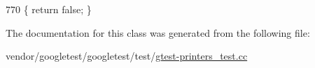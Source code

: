 \begin{DoxyCode}
770 \{ \textcolor{keywordflow}{return} \textcolor{keyword}{false}; \}
\end{DoxyCode}


The documentation for this class was generated from the following file\+:\begin{DoxyCompactItemize}
\item 
vendor/googletest/googletest/test/\hyperlink{gtest-printers__test_8cc}{gtest-\/printers\+\_\+test.\+cc}\end{DoxyCompactItemize}
